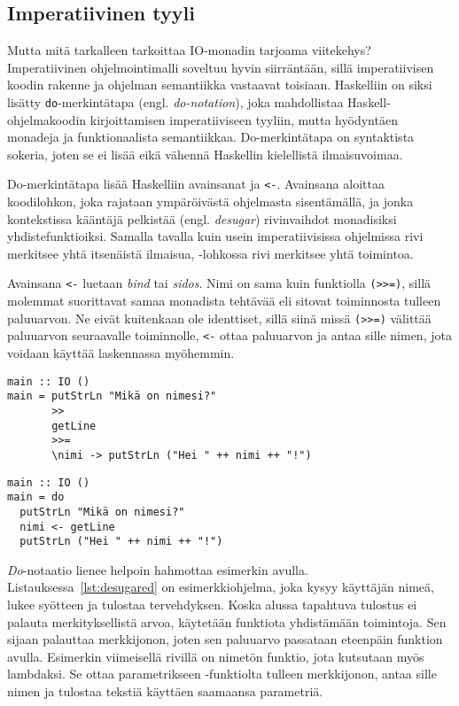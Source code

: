 \documentclass[finnish]{tktltiki2}
\begin{document}
\subsection{Imperatiivinen tyyli}

Mutta mitä tarkalleen tarkoittaa IO-monadin tarjoama viitekehys? Imperatiivinen ohjelmointimalli
soveltuu hyvin siirräntään, sillä imperatiivisen koodin rakenne ja ohjelman semantiikka vastaavat
toisiaan. Haskelliin on siksi lisätty \verb|do|-merkintätapa (engl. \emph{do-notation}), joka
mahdollistaa Haskell-ohjelmakoodin kirjoittamisen imperatiiviseen tyyliin, mutta hyödyntäen monadeja
ja funktionaalista semantiikkaa. Do-merkintätapa on syntaktista sokeria, joten se ei lisää eikä
vähennä Haskellin kielellistä ilmaisuvoimaa.

Do-merkintätapa lisää Haskelliin avainsanat  ja \verb|<-|. Avainsana  aloittaa
koodilohkon, joka rajataan ympäröivästä ohjelmasta sisentämällä, ja jonka kontekstissa kääntäjä
pelkistää (engl. \emph{desugar}) rivinvaihdot monadisiksi yhdistefunktioiksi. Samalla tavalla kuin
usein imperatiivisissa ohjelmissa rivi merkitsee yhtä itsenäistä ilmaisua, -lohkossa rivi
merkitsee yhtä toimintoa.

Avainsana \verb|<-| luetaan \emph{bind} tai \emph{sidos}. Nimi on sama kuin funktiolla \verb|(>>=)|,
sillä molemmat suorittavat samaa monadista tehtävää eli sitovat toiminnosta tulleen paluuarvon. Ne
eivät kuitenkaan ole identtiset, sillä siinä missä \verb|(>>=)| välittää paluuarvon seuraavalle
toiminnolle, \verb|<-| ottaa paluuarvon ja antaa sille nimen, jota voidaan käyttää laskennassa
myöhemmin.

\begin{lstlisting}[float,label={lst:desugared},caption={Funktionaalinen tyyli}]
main :: IO ()
main = putStrLn "Mikä on nimesi?"
       >>
       getLine
       >>=
       \nimi -> putStrLn ("Hei " ++ nimi ++ "!")
\end{lstlisting}

\begin{lstlisting}[float,label={lst:donotation},caption={Imperatiivinen tyyli ja do-merkintätapa}]
main :: IO ()
main = do
  putStrLn "Mikä on nimesi?"
  nimi <- getLine
  putStrLn ("Hei " ++ nimi ++ "!")
\end{lstlisting}


\emph{Do}-notaatio lienee helpoin hahmottaa esimerkin avulla. Listauksessa~\ref{lst:desugared} on
esimerkkiohjelma, joka kysyy käyttäjän nimeä, lukee syötteen ja tulostaa tervehdyksen. Koska alussa
tapahtuva tulostus ei palauta merkityksellistä arvoa, käytetään funktiota  yhdistämään
toimintoja. Sen sijaan  palauttaa merkkijonon, joten sen paluuarvo passataan eteenpäin
funktion  avulla. Esimerkin viimeisellä rivillä on nimetön funktio, jota kutsutaan myös
lambdaksi. Se ottaa parametrikseen -funktiolta tulleen merkkijonon, antaa sille nimen
 ja tulostaa tekstiä käyttäen saamaansa parametriä.
\end{document}
